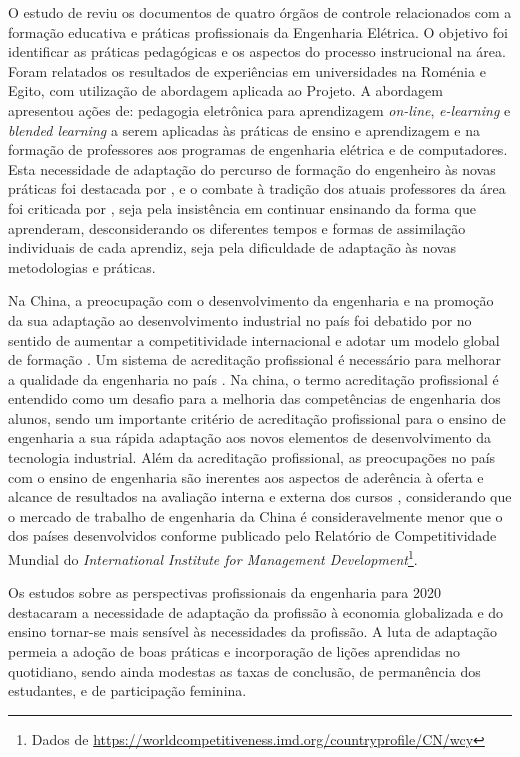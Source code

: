 \documentclass{textolivre-html}
\begin{document}
O estudo de \textcite{eldin2018} reviu os documentos de quatro órgãos de controle relacionados com a formação educativa e práticas profissionais da Engenharia Elétrica. O objetivo foi identificar as práticas pedagógicas e os aspectos do processo instrucional na área. Foram relatados os resultados de experiências em universidades na Roménia e Egito, com utilização de abordagem aplicada ao Projeto. A abordagem apresentou ações de: pedagogia eletrônica para aprendizagem \textit{on-line}, \textit{e-learning} e \textit{blended learning} a serem aplicadas às práticas de ensino e aprendizagem e na formação de professores aos programas de engenharia elétrica e de computadores. Esta necessidade de adaptação do percurso de formação do engenheiro às novas práticas foi destacada por \textcite{maciejewski2017}, e o combate à tradição dos atuais professores da área foi criticada por \textcite{sheppard2008}, seja pela insistência em continuar ensinando da forma que aprenderam, desconsiderando os diferentes tempos e formas de assimilação individuais de cada aprendiz, seja pela dificuldade de adaptação às novas metodologias e práticas.

Na China, a preocupação com o desenvolvimento da engenharia e na promoção da sua adaptação ao desenvolvimento industrial no país foi debatido por \textcite{patil2007} no sentido de aumentar a competitividade internacional e adotar um modelo global de formação \cite{shuguang2019}. Um sistema de acreditação profissional é necessário para melhorar a qualidade da engenharia no país \cite{lu2019}. Na china, o termo acreditação profissional é entendido como um desafio para a melhoria das competências de engenharia dos alunos, sendo um importante critério de acreditação profissional para o ensino de engenharia a sua rápida adaptação aos novos elementos de desenvolvimento da tecnologia industrial. Além da acreditação profissional, as preocupações no país com o ensino de engenharia são inerentes aos aspectos de aderência à oferta e alcance de resultados na avaliação interna e externa dos cursos \cite{li2020}, considerando que o mercado de trabalho de engenharia da China é consideravelmente menor que o dos países desenvolvidos conforme publicado pelo Relatório de Competitividade Mundial do \textit{International Institute for Management Development}\footnote{Dados de \url{https://worldcompetitiveness.imd.org/countryprofile/CN/wcy}}.

Os estudos sobre as perspectivas profissionais da engenharia para 2020 \cite{clough2004,engineering2005,olson2016,sheppard2008} destacaram a necessidade de adaptação da profissão à economia globalizada e do ensino tornar-se mais sensível às necessidades da profissão. A luta de adaptação permeia a adoção de boas práticas e incorporação de lições aprendidas no quotidiano, sendo ainda modestas as taxas de conclusão, de permanência dos estudantes, e de participação feminina.
\end{document}
